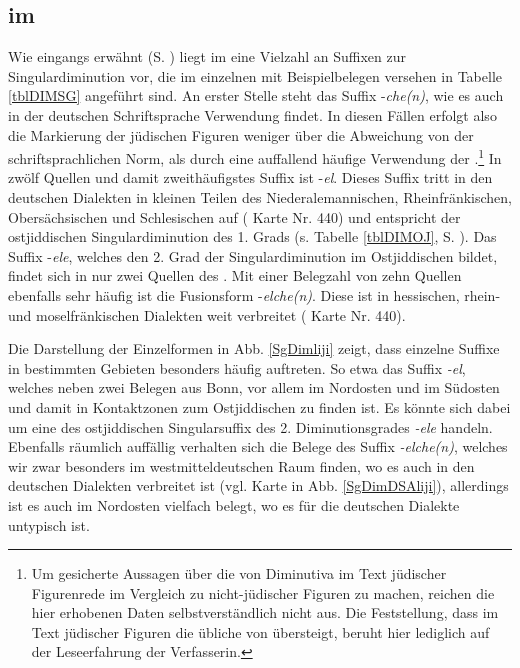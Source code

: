  
  \subsection{ im }\label{dimsg}
 
Wie eingangs erwähnt (S. \pageref{AnzahlDIM}) liegt im  eine Vielzahl an Suffixen zur Singulardiminution vor, die im einzelnen mit Beispielbelegen versehen in Tabelle \ref{tblDIMSG} angeführt sind. An erster Stelle steht das Suffix -\textit{che(n)}, wie es auch in der deutschen Schriftsprache Verwendung findet. In diesen Fällen erfolgt also die Markierung der jüdischen Figuren weniger über die Abweichung von der schriftsprachlichen Norm, als durch eine auffallend häufige Verwendung der .\footnote{Um gesicherte Aussagen über die  von Diminutiva im Text jüdischer Figurenrede im Vergleich zu nicht-jüdischer Figuren zu machen, reichen die hier erhobenen Daten selbstverständlich nicht aus. Die Feststellung, dass  im Text  jüdischer Figuren die übliche  von  übersteigt, beruht hier lediglich auf der Leseerfahrung der Verfasserin.} In zwölf Quellen und damit zweithäufigstes Suffix ist -\textit{el}. Dieses Suffix tritt in den deutschen Dialekten in kleinen Teilen des Niederalemannischen, Rheinfränkischen, Obersächsischen und Schlesischen auf ( Karte Nr. 440) und entspricht der ostjiddischen Singulardiminution des 1. Grads (s. Tabelle \ref{tblDIMOJ}, S. \pageref{tblDIMOJ}). Das Suffix -\textit{ele}, welches den 2. Grad der Singulardiminution im Ostjiddischen bildet, findet sich in nur zwei Quellen des . Mit einer Belegzahl von zehn Quellen ebenfalls sehr häufig ist die Fusionsform -\textit{elche(n)}. Diese ist in hessischen, rhein- und moselfränkischen Dialekten weit verbreitet ( Karte Nr. 440). 

Die Darstellung der Einzelformen in Abb. \ref{SgDimliji} zeigt, dass einzelne Suffixe in bestimmten Gebieten besonders häufig auftreten. So etwa das Suffix \textit{-el}, welches neben zwei Belegen aus Bonn, vor allem im Nordosten und im Südosten und damit in Kontaktzonen zum Ostjiddischen zu finden ist. Es könnte sich dabei um eine  des ostjiddischen Singularsuffix des 2. Diminutionsgrades \textit{-ele} handeln. Ebenfalls räumlich auffällig verhalten sich die Belege des Suffix \textit{-elche(n)}, welches wir zwar besonders im westmitteldeutschen Raum finden, wo es auch in den deutschen Dialekten verbreitet ist (vgl. Karte in Abb. \ref{SgDimDSAliji}), allerdings ist es auch im Nordosten vielfach belegt, wo es für die deutschen Dialekte untypisch ist. 



